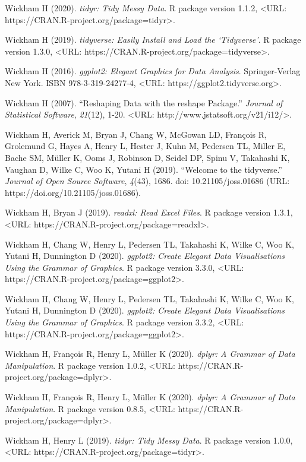 \documentclass{puthesis}
\begin{document}
Wickham H (2020). \emph{tidyr: Tidy Messy Data}. R package version
1.1.2, \textless URL:
https://CRAN.R-project.org/package=tidyr\textgreater.

Wickham H (2019). \emph{tidyverse: Easily Install and Load the
`Tidyverse'}. R package version 1.3.0, \textless URL:
https://CRAN.R-project.org/package=tidyverse\textgreater.

Wickham H (2016). \emph{ggplot2: Elegant Graphics for Data Analysis}.
Springer-Verlag New York. ISBN 978-3-319-24277-4, \textless URL:
https://ggplot2.tidyverse.org\textgreater.

Wickham H (2007). ``Reshaping Data with the reshape Package.''
\emph{Journal of Statistical Software}, \emph{21}(12), 1-20.
\textless URL: http://www.jstatsoft.org/v21/i12/\textgreater.

Wickham H, Averick M, Bryan J, Chang W, McGowan LD, François R,
Grolemund G, Hayes A, Henry L, Hester J, Kuhn M, Pedersen TL, Miller E,
Bache SM, Müller K, Ooms J, Robinson D, Seidel DP, Spinu V, Takahashi K,
Vaughan D, Wilke C, Woo K, Yutani H (2019). ``Welcome to the
tidyverse.'' \emph{Journal of Open Source Software}, \emph{4}(43), 1686.
doi: 10.21105/joss.01686 (URL: https://doi.org/10.21105/joss.01686).

Wickham H, Bryan J (2019). \emph{readxl: Read Excel Files}. R package
version 1.3.1, \textless URL:
https://CRAN.R-project.org/package=readxl\textgreater.

Wickham H, Chang W, Henry L, Pedersen TL, Takahashi K, Wilke C, Woo K,
Yutani H, Dunnington D (2020). \emph{ggplot2: Create Elegant Data
Visualisations Using the Grammar of Graphics}. R package version 3.3.0,
\textless URL: https://CRAN.R-project.org/package=ggplot2\textgreater.

Wickham H, Chang W, Henry L, Pedersen TL, Takahashi K, Wilke C, Woo K,
Yutani H, Dunnington D (2020). \emph{ggplot2: Create Elegant Data
Visualisations Using the Grammar of Graphics}. R package version 3.3.2,
\textless URL: https://CRAN.R-project.org/package=ggplot2\textgreater.

Wickham H, François R, Henry L, Müller K (2020). \emph{dplyr: A Grammar
of Data Manipulation}. R package version 1.0.2, \textless URL:
https://CRAN.R-project.org/package=dplyr\textgreater.

Wickham H, François R, Henry L, Müller K (2020). \emph{dplyr: A Grammar
of Data Manipulation}. R package version 0.8.5, \textless URL:
https://CRAN.R-project.org/package=dplyr\textgreater.

Wickham H, Henry L (2019). \emph{tidyr: Tidy Messy Data}. R package
version 1.0.0, \textless URL:
https://CRAN.R-project.org/package=tidyr\textgreater.
\end{document}
